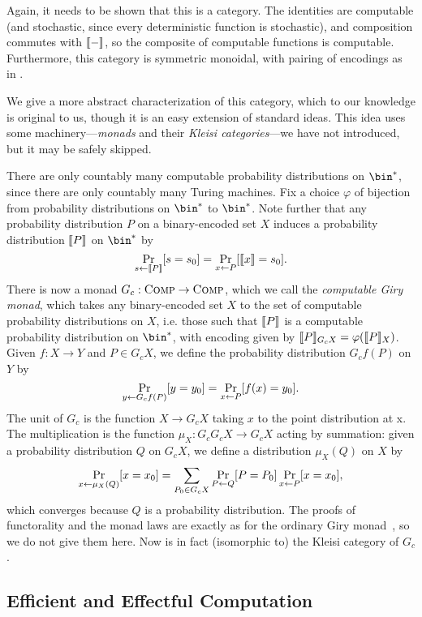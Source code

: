 Again, it needs to be shown that this is a category. The identities are
computable (and stochastic, since every deterministic function is stochastic),
and composition commutes with $\llbracket - \rrbracket$, so the composite of computable
functions is computable. Furthermore, this category is symmetric monoidal, with
pairing of encodings as in .

We give a more abstract characterization of this category, which to our
knowledge is original to us, though it is an easy extension of standard ideas.
This idea uses some machinery---\emph{monads} and their \emph{Kleisi
categories}---we have not introduced, but it may be safely skipped.

There are only countably many computable probability distributions on $\bin^*$,
since there are only countably many Turing machines. Fix a choice $\varphi$ of
bijection from probability distributions on $\bin^*$ to $\bin^*$. Note further
that any probability distribution $P$ on a binary-encoded set $X$ induces a
probability distribution $\llbracket P \rrbracket$ on $\bin^*$ by \[ \Pr_{s\leftarrow
\llbracket P \rrbracket}[s = s_0] = \Pr_{x\leftarrow P}[\llbracket x \rrbracket = s_0]. \] There is now a monad
$G_c: {\textsc{\text{Comp}}}\to{\textsc{\text{Comp}}}$, which we call the \emph{computable Giry
monad}, which takes any binary-encoded set $X$ to the set of computable
probability distributions on $X$, i.e. those such that $\llbracket P \rrbracket$ is a
computable probability distribution on $\bin^*$, with encoding given by
$\llbracket P \rrbracket_{G_c X} = \varphi(\llbracket P \rrbracket_X)$. Given $f: X\to Y$ and $P\in G_c
X$, we define the probability distribution $G_c f(P)$ on $Y$ by \[ \Pr_{y\leftarrow
  G_c f(P)}[y = y_0] = \Pr_{x\leftarrow P}[f(x) = y_0]. \] The unit of $G_c$ is the
  function $X\to G_c X$ taking $x$ to the point distribution at x. The
  multiplication is the function $\mu_X: G_c G_c X\to G_c X$ acting by
  summation: given a probability distribution $Q$ on $G_c X$, we define a
  distribution $\mu_X (Q)$ on $X$ by \begin{equation*}\label{eqn:giry-sum}
  \Pr_{x\leftarrow \mu_X(Q)}[x = x_0] = \sum_{P_0\in G_c X}
\Pr_{P\leftarrow Q}[P = P_0]\Pr_{x\leftarrow P}[x = x_0], \end{equation*}which converges
because $Q$ is a probability distribution. The proofs of functorality and the
monad laws are exactly as for the ordinary Giry monad~\cite{giry-1982}, so we do
not give them here. Now  is in fact (isomorphic to) the Kleisi
category of $G_c$.

\subsection{Efficient and Effectful Computation}
\label{sec:ef-comp}

